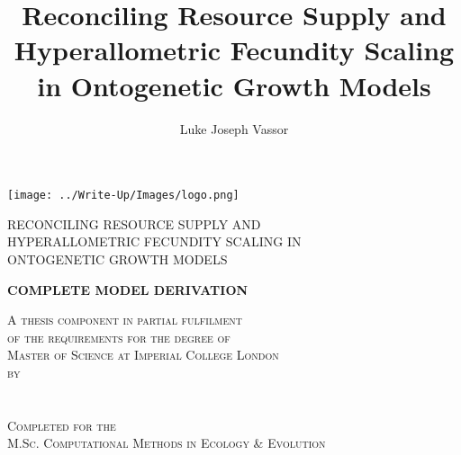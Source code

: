 \documentclass[a3paper]{article} %
\title{Reconciling Resource Supply and Hyperallometric Fecundity Scaling in Ontogenetic Growth Models}
\author{Luke Joseph Vassor}
\begin{document}
\begin{titlepage}
    
    \texttt{[image: ../Write-Up/Images/logo.png]}\\%
     
    
    \center %
    
    
    \makeatletter
    \vspace{4cm}
    \linespread{1.5} %
        {\huge{RECONCILING RESOURCE SUPPLY AND \\ HYPERALLOMETRIC FECUNDITY SCALING IN \\ ONTOGENETIC GROWTH MODELS}\par} %
    \vspace{2.5cm}
        {\huge\bfseries{COMPLETE MODEL DERIVATION}\par}
    \vspace{2.5cm} %

    \textsc{A thesis component in partial fulfilment \\ of the requirements for the degree of \\ Master of Science at Imperial College London \\ by \\ \ }\\[2.5cm]
    \textsc{\Large \@author}\\[2.5cm]
    \textsc{Completed for the \\ M.Sc. Computational Methods in Ecology \& Evolution \ }\\[2cm]


\end{titlepage}
\end{document}
